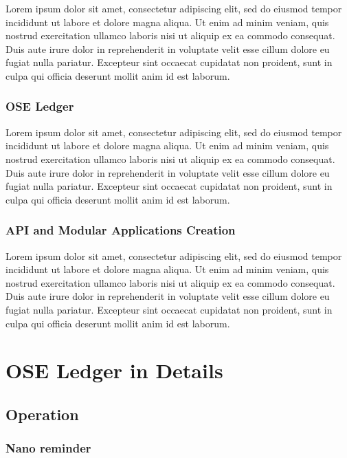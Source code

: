 \documentclass[a4paper]{article}
\begin{document}
Lorem ipsum dolor sit amet, consectetur adipiscing elit, sed do eiusmod tempor incididunt ut labore et dolore magna aliqua. Ut enim ad minim veniam, quis nostrud exercitation ullamco laboris nisi ut aliquip ex ea commodo consequat. Duis aute irure dolor in reprehenderit in voluptate velit esse cillum dolore eu fugiat nulla pariatur. Excepteur sint occaecat cupidatat non proident, sunt in culpa qui officia deserunt mollit anim id est laborum.

\subsubsection{OSE Ledger}

Lorem ipsum dolor sit amet, consectetur adipiscing elit, sed do eiusmod tempor incididunt ut labore et dolore magna aliqua. Ut enim ad minim veniam, quis nostrud exercitation ullamco laboris nisi ut aliquip ex ea commodo consequat. Duis aute irure dolor in reprehenderit in voluptate velit esse cillum dolore eu fugiat nulla pariatur. Excepteur sint occaecat cupidatat non proident, sunt in culpa qui officia deserunt mollit anim id est laborum.

\subsubsection{API and Modular Applications Creation}

Lorem ipsum dolor sit amet, consectetur adipiscing elit, sed do eiusmod tempor incididunt ut labore et dolore magna aliqua. Ut enim ad minim veniam, quis nostrud exercitation ullamco laboris nisi ut aliquip ex ea commodo consequat. Duis aute irure dolor in reprehenderit in voluptate velit esse cillum dolore eu fugiat nulla pariatur. Excepteur sint occaecat cupidatat non proident, sunt in culpa qui officia deserunt mollit anim id est laborum.

\newpage

\section{OSE Ledger in Details}

\subsection{Operation}

\subsubsection{Nano reminder}
\end{document}

